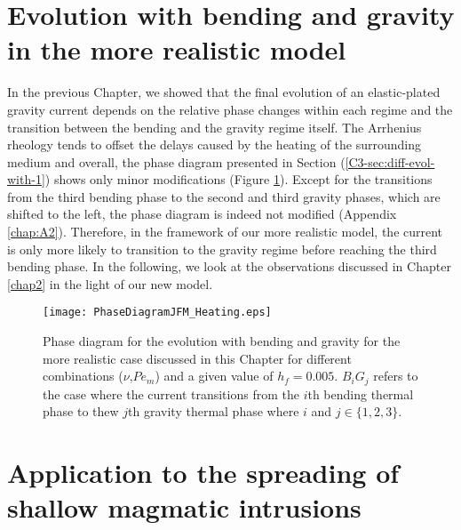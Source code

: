 \section{Evolution  with bending  and  gravity in  the more  realistic
  model}
\label{C4-sec:evol-with-bend}

In the  previous Chapter,  we showed  that the  final evolution  of an
elastic-plated gravity  current depends on the  relative phase changes
within  each regime  and the  transition between  the bending  and the
gravity regime  itself.  The  Arrhenius rheology  tends to  offset the
delays caused by the heating of the surrounding medium and overall, the
phase  diagram  presented in  Section  (\ref{C3-sec:diff-evol-with-1})
shows         only         minor         modifications         (Figure
\ref{C4-Phase_Diagram_Heating}).  Except for  the transitions from the
third bending phase to the second  and third gravity phases, which are
shifted  to  the  left,  the  phase diagram  is  indeed  not  modified
(Appendix  \ref{chap:A2}). Therefore,  in  the framework  of our  more
realistic model, the current is only  more likely to transition to the
gravity  regime  before reaching  the  third  bending phase.   In  the
following,  we   look  at   the  observations  discussed   in  Chapter
\ref{chap2} in the light of our new model.

\begin{figure}[h!]
  \begin{center}
    \graphicspath{ {/Users/thorey/Documents/These/Projet/Refroidissement/Skin_Model/Figure/Figure_Heating/} }
    \texttt{[image: PhaseDiagramJFM\_Heating.eps]}
    \caption{Phase diagram for the  evolution with bending and gravity
      for  the  more realistic  case  discussed  in this  Chapter  for
      different  combinations  ($\nu$,$Pe_m$)  and a  given  value  of
      $h_f =  0.005$.  $B_iG_j$ refers  to the case where  the current
      transitions from the  $i$th bending thermal phase  to thew $j$th
      gravity thermal phase where $i$ and $j \in \{1,2,3\}$.}
    \label{C4-Phase_Diagram_Heating}
  \end{center}
\end{figure}

\section[Application     to      the     spreading      of     shallow
intrusions]{Application   to  the   spreading   of  shallow   magmatic
  intrusions}
\label{C4-sec:appl-spre-shall}

